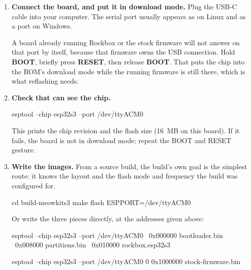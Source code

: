 \begin{enumerate}

\item \textbf{Connect the board, and put it in download mode.} Plug the USB-C cable
  into your computer. The serial port usually appears as  on Linux
  and as a  port on Windows.

  A board already running Rockbox or the stock firmware will not answer on that port by
  itself, because that firmware owns the USB connection. Hold \textbf{BOOT}, briefly
  press \textbf{RESET}, then release \textbf{BOOT}. That puts the chip into the ROM's
  download mode while the running firmware is still there, which is what reflashing
  needs.

\item \textbf{Check that  can see the chip.}

\begin{code}
    esptool --chip esp32s3 --port /dev/ttyACM0 
\end{code}

  This prints the chip revision and the flash size (16~MB on this board). If it fails,
  the board is not in download mode; repeat the BOOT and RESET gesture.

\item \textbf{Write the images.} From a source build, the build's own goal is the
  simplest route: it knows the layout and the flash mode and frequency the build was
  configured for.

\begin{code}
    cd build-meowkits3
    make flash ESPPORT=/dev/ttyACM0
\end{code}

  Or write the three pieces directly, at the addresses given above:

\begin{code}
    esptool --chip esp32s3 --port /dev/ttyACM0  \
        0x000000 bootloader.bin \
        0x008000 partitions.bin \
        0x010000 rockbox.esp32s3
\end{code}


\begin{code}
    esptool --chip esp32s3 --port /dev/ttyACM0  0 0x1000000 stock-firmware.bin
\end{code}


\end{enumerate}
